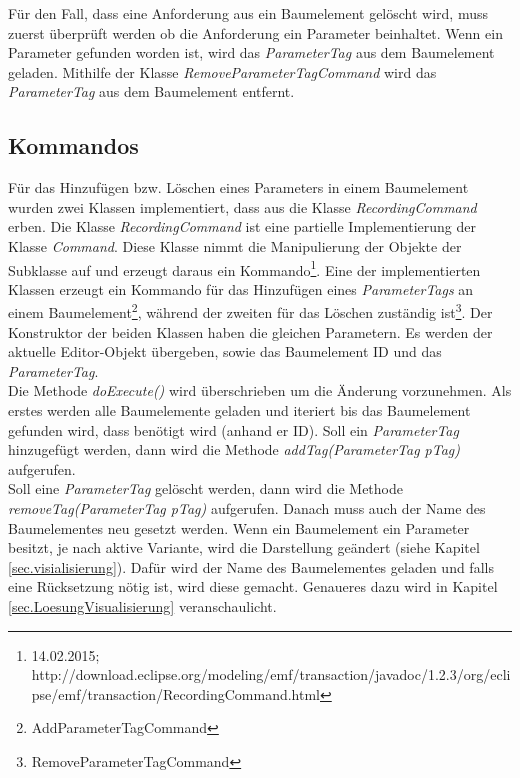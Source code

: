 Für den Fall, dass eine Anforderung aus ein Baumelement gelöscht wird, muss zuerst überprüft werden ob die Anforderung ein Parameter beinhaltet. Wenn ein Parameter gefunden worden ist, wird das \textit{ParameterTag} aus dem Baumelement geladen. Mithilfe der Klasse \textit{RemoveParameterTagCommand} wird das \textit{ParameterTag} aus dem Baumelement entfernt.

\subsection{Kommandos}\label{sub.Command}
Für das Hinzufügen bzw. Löschen eines Parameters in einem Baumelement wurden zwei Klassen implementiert, dass aus die Klasse \textit{RecordingCommand} erben. Die Klasse \textit{RecordingCommand} ist eine partielle Implementierung der Klasse \textit{Command}. Diese Klasse nimmt die  Manipulierung der Objekte der Subklasse auf und erzeugt daraus ein Kommando\footnote{14.02.2015; http://download.eclipse.org/modeling/emf/transaction/javadoc/1.2.3/org/eclipse/emf/transaction/RecordingCommand.html}. Eine der implementierten Klassen erzeugt ein Kommando für das Hinzufügen eines \textit{ParameterTags} an einem Baumelement\footnote{AddParameterTagCommand}, während der zweiten für das Löschen zuständig ist\footnote{RemoveParameterTagCommand}. Der Konstruktor der beiden Klassen haben die gleichen Parametern. Es werden der aktuelle Editor-Objekt übergeben, sowie das Baumelement ID und das \textit{ParameterTag}.\\


Die Methode \textit{doExecute()} wird überschrieben um die Änderung vorzunehmen. Als erstes werden alle Baumelemente geladen und iteriert bis das Baumelement gefunden wird, dass benötigt wird (anhand er ID). Soll ein \textit{ParameterTag} hinzugefügt werden, dann wird die Methode \textit{addTag(ParameterTag pTag)} aufgerufen.\\


Soll eine \textit{ParameterTag} gelöscht werden, dann wird die Methode \textit{removeTag(ParameterTag pTag)} aufgerufen. Danach muss auch der Name des Baumelementes neu gesetzt werden. Wenn ein Baumelement ein Parameter besitzt, je nach aktive Variante, wird die Darstellung geändert (siehe Kapitel \ref{sec.visialisierung}). Dafür wird der Name des Baumelementes geladen und falls eine Rücksetzung nötig ist, wird diese gemacht. Genaueres dazu wird in Kapitel \ref{sec.LoesungVisualisierung} veranschaulicht.\\

